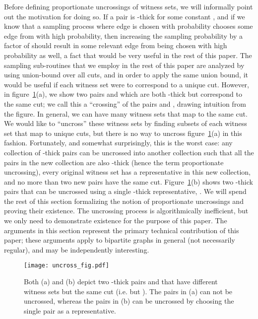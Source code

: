 \documentclass[11pt]{article}
\begin{document}
Before defining proportionate uncrossings of witness sets, we will informally
point out the motivation for doing so. If a pair  is -thick for
some constant , and if we know that a sampling process where edge 
is chosen with probability  chooses some edge from  with high
probability, then increasing the sampling probability by a factor of
 should result in some relevant edge from  being chosen with
high probability as well, a fact that would be very useful in the rest of this
paper. The sampling sub-routines that we employ in the rest of this paper are
analyzed by using union-bound over all cuts, and in order to apply the same
union bound, it would be useful if each witness set were to correspond to a
unique cut. However, in figure~\ref{fig:cross}(a), we show two pairs 
and  which are both -thick but correspond to the same cut; we
call this a ``crossing'' of the pairs  and , drawing intuition
from the figure. In general, we can have many witness sets that map to the
same cut. We would like to ``uncross'' these witness sets by finding subsets
of each witness set that map to unique cuts, but there is no way to uncross
figure~\ref{fig:cross}(a) in this fashion. Fortunately, and somewhat
surprisingly, this is the worst case: any collection of -thick pairs
can be uncrossed into another collection such that all the pairs in the new
collection are also -thick (hence the term proportionate uncrossing),
every original witness set has a representative in this new collection, and no
more than two new pairs have the same cut. Figure~\ref{fig:cross}(b) shows two
-thick pairs that can be uncrossed using a single -thick
representative, . We will spend the rest of this section
formalizing the notion of proportionate uncrossings and proving their
existence. The uncrossing process is algorithmically inefficient, but we only
need to demonstrate existence for the purpose of this paper. The arguments in
this section represent the primary technical contribution of this paper; these
arguments apply to bipartite graphs in general (not necessarily regular), and
may be independently interesting. \vspace{-0.1in}
\begin{figure}[htbp]
  \centering
  \texttt{[image: uncross\_fig.pdf]}
  \vspace{-0.15in}
  \caption{ Both (a) and (b) depict two -thick pairs  and
     that have different witness sets but the same cut (i.e.  but ). The pairs in
    (a) can not be uncrossed, whereas the pairs in (b) can be uncrossed by
    choosing the single pair  as a representative.}
\label{fig:cross}
\end{figure}
\end{document}
